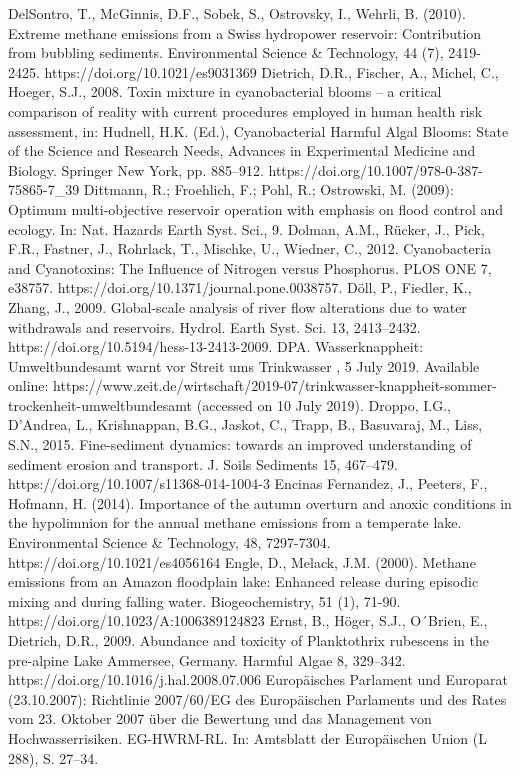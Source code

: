 \begin{thebibliography}{}
DelSontro, T., McGinnis, D.F., Sobek, S., Ostrovsky, I., Wehrli, B. (2010). Extreme methane emissions from a Swiss hydropower reservoir: Contribution from bubbling sediments. Environmental Science & Technology, 44 (7), 2419-2425. https://doi.org/10.1021/es9031369
Dietrich, D.R., Fischer, A., Michel, C., Hoeger, S.J., 2008. Toxin mixture in cyanobacterial blooms – a critical comparison of reality with current procedures employed in human health risk assessment, in: Hudnell, H.K. (Ed.), Cyanobacterial Harmful Algal Blooms: State of the Science and Research Needs, Advances in Experimental Medicine and Biology. Springer New York, pp. 885–912. https://doi.org/10.1007/978-0-387-75865-7_39
Dittmann, R.; Froehlich, F.; Pohl, R.; Ostrowski, M. (2009): Optimum multi-objective reservoir operation with emphasis on flood control and ecology. In: Nat. Hazards Earth Syst. Sci., 9.
Dolman, A.M., Rücker, J., Pick, F.R., Fastner, J., Rohrlack, T., Mischke, U., Wiedner, C., 2012. Cyanobacteria and Cyanotoxins: The Influence of Nitrogen versus Phosphorus. PLOS ONE 7, e38757. https://doi.org/10.1371/journal.pone.0038757.
Döll, P., Fiedler, K., Zhang, J., 2009. Global-scale analysis of river flow alterations due to water withdrawals and reservoirs. Hydrol. Earth Syst. Sci. 13, 2413–2432. https://doi.org/10.5194/hess-13-2413-2009.
DPA. Wasserknappheit: Umweltbundesamt warnt vor Streit ums Trinkwasser , 5 July 2019. Available online: https://www.zeit.de/wirtschaft/2019-07/trinkwasser-knappheit-sommer-trockenheit-umweltbundesamt (accessed on 10 July 2019).
Droppo, I.G., D’Andrea, L., Krishnappan, B.G., Jaskot, C., Trapp, B., Basuvaraj, M., Liss, S.N., 2015. Fine-sediment dynamics: towards an improved understanding of sediment erosion and transport. J. Soils Sediments 15, 467–479. https://doi.org/10.1007/s11368-014-1004-3
Encinas Fernandez, J., Peeters, F., Hofmann, H. (2014). Importance of the autumn overturn and anoxic conditions in the hypolimnion for the annual methane emissions from a temperate lake. Environmental Science & Technology, 48, 7297-7304. https://doi.org/10.1021/es4056164
Engle, D., Melack, J.M. (2000). Methane emissions from an Amazon floodplain lake: Enhanced release during episodic mixing and during falling water. Biogeochemistry, 51 (1), 71-90. https://doi.org/10.1023/A:1006389124823
Ernst, B., Höger, S.J., O´Brien, E., Dietrich, D.R., 2009. Abundance and toxicity of Planktothrix rubescens in the pre-alpine Lake Ammersee, Germany. Harmful Algae 8, 329–342. https://doi.org/10.1016/j.hal.2008.07.006
Europäisches Parlament und Europarat (23.10.2007): Richtlinie 2007/60/EG des Europäischen Parlaments und des Rates vom 23. Oktober 2007 über die Bewertung und das Management von Hochwasserrisiken. EG-HWRM-RL. In: Amtsblatt der Europäischen Union (L 288), S. 27–34.

\end{thebibliography}
